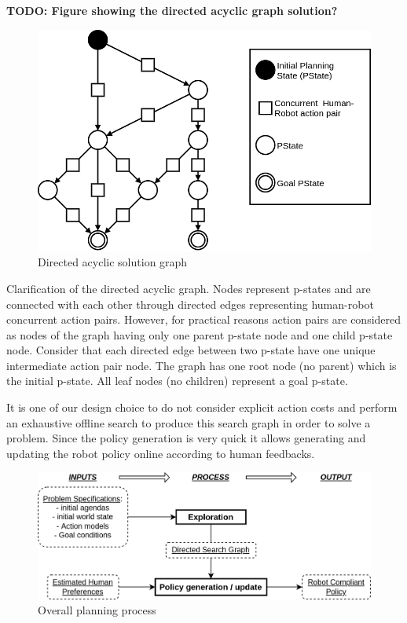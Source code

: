 \textbf{TODO: Figure showing the directed acyclic graph solution?}
\begin{figure}
    \centering
    \includegraphics[width=0.7\linewidth]{images/Chapter4/solution_graph.png}
    \caption{Directed acyclic solution graph}
    \label{fig:solution_graph}
\end{figure}

Clarification of the directed acyclic graph. Nodes represent p-states and are connected with each other through directed edges representing human-robot concurrent action pairs. However, for practical reasons action pairs are considered as nodes of the graph having only one parent p-state node and one child p-state node. Consider that each directed edge between two p-state have one unique intermediate action pair node. The graph has one root node (no parent) which is the initial p-state. All leaf nodes (no children) represent a goal p-state. 

It is one of our design choice to do not consider explicit action costs and perform an exhaustive offline search to produce this search graph in order to solve a problem. Since the policy generation is very quick it allows generating and updating the robot policy online according to human feedbacks. 


\begin{figure}
    \includegraphics[width=\linewidth]{images/Chapter4/overall_process.png}
    \caption{Overall planning process}
    \label{fig:overall_process}
\end{figure}




